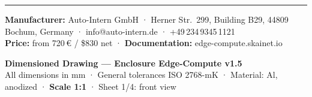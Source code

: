 \documentclass[10pt,a4paper]{article}
\begin{document}
\vspace{2mm}\hrule\vspace{1.5mm}
{\small
\textbf{Manufacturer:} Auto-Intern GmbH · Herner Str.\ 299, Building B29, 44809 Bochum, Germany · info@auto-intern.de · +49\,234\,9345\,1121\\
\textbf{Price:} from 720\,€ / \$830 net · \textbf{Documentation:} edge-compute.skainet.io}

\newpage
\thispagestyle{fancy}
\begin{center}
{\large\textbf{Dimensioned Drawing — Enclosure Edge-Compute v1.5}}\\[1mm]
{\small All dimensions in mm · General tolerances ISO 2768-mK · Material: Al, anodized · \textbf{Scale 1:1} · Sheet 1/4: front view}
\end{center}
\vfill
\end{document}

